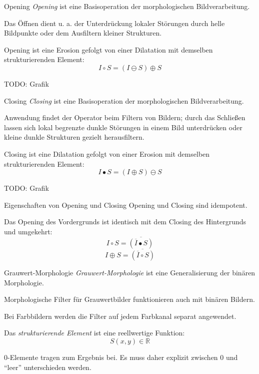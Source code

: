 \begin{defi}{Opening}
    \emph{Opening} ist eine Basisoperation der morphologischen Bildverarbeitung.

    Das Öffnen dient u. a. der Unterdrückung lokaler Störungen durch helle Bildpunkte oder dem Ausfiltern kleiner Strukturen.

    Opening ist eine Erosion gefolgt von einer Dilatation mit demselben strukturierenden Element:
    \[
        I \circ S = (I \ominus S) \oplus S
    \]

    TODO: Grafik
\end{defi}

\begin{defi}{Closing}
    \emph{Closing} ist eine Basisoperation der morphologischen Bildverarbeitung.

    Anwendung findet der Operator beim Filtern von Bildern;
    durch das Schließen lassen sich lokal begrenzte dunkle Störungen in einem Bild unterdrücken oder kleine dunkle Strukturen gezielt herausfiltern.

    Closing ist eine Dilatation gefolgt von einer Erosion mit demselben strukturierenden Element:
    \[
        I \bullet S = (I \oplus S) \ominus S
    \]

    TODO: Grafik
\end{defi}

\begin{bonus}{Eigenschaften von Opening und Closing}
    Opening und Closing sind idempotent.

    Das Opening des Vordergrunds ist identisch mit dem Closing des Hintergrunds und umgekehrt:
    \[
        I \circ S = \overline{(\overline{I} \bullet S)}
    \]
    \[
        I \oplus S = \overline{(\overline{I} \circ S)}
    \]
\end{bonus}

\begin{defi}{Grauwert-Morphologie}
    \emph{Grauwert-Morphologie} ist eine Generalisierung der binären Morphologie.

    Morphologische Filter für Grauwertbilder funktionieren auch mit binären Bildern.

    Bei Farbbildern werden die Filter auf jedem Farbkanal separat angewendet.

    Das \emph{strukturierende Element} ist eine reellwertige Funktion:
    \[
        S(x, y) \in \mathbb{R}
    \]

    $0$-Elemente tragen zum Ergebnis bei.
    Es muss daher explizit zwischen $0$ und \enquote{leer} unterschieden werden.
\end{defi}

